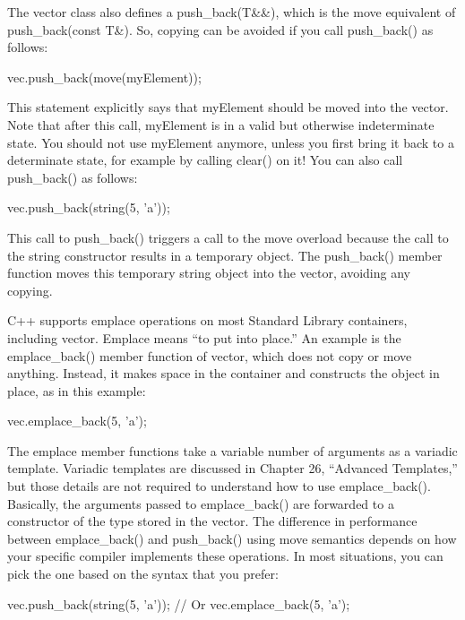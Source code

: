 The vector class also defines a push\_back(T\&\&), which is the move equivalent of push\_back(const T\&). So, copying can be avoided if you call push\_back() as follows:

\begin{cpp}
vec.push_back(move(myElement));
\end{cpp}

This statement explicitly says that myElement should be moved into the vector. Note that after this call, myElement is in a valid but otherwise indeterminate state. You should not use myElement anymore, unless you first bring it back to a determinate state, for example by calling clear() on it! You can also call push\_back() as follows:

\begin{cpp}
vec.push_back(string(5, 'a'));
\end{cpp}

This call to push\_back() triggers a call to the move overload because the call to the string constructor results in a temporary object. The push\_back() member function moves this temporary string object into the vector, avoiding any copying.


C++ supports emplace operations on most Standard Library containers, including vector. Emplace means “to put into place.” An example is the emplace\_back() member function of vector, which does not copy or move anything. Instead, it makes space in the container and constructs the object in place, as in this example:

\begin{cpp}
vec.emplace_back(5, 'a');
\end{cpp}

The emplace member functions take a variable number of arguments as a variadic template. Variadic templates are discussed in Chapter 26, “Advanced Templates,” but those details are not required to understand how to use emplace\_back(). Basically, the arguments passed to emplace\_back() are forwarded to a constructor of the type stored in the vector. The difference in performance between emplace\_back() and push\_back() using move semantics depends on how your specific compiler implements these operations. In most situations, you can pick the one based on the syntax that you prefer:

\begin{cpp}
vec.push_back(string(5, 'a'));
// Or
vec.emplace_back(5, 'a');
\end{cpp}

